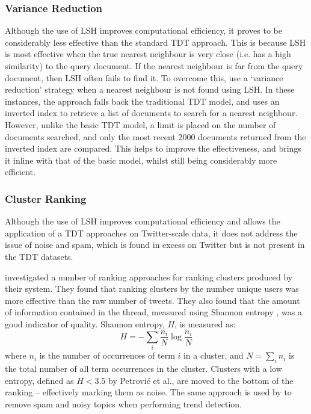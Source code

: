 \subsubsection{Variance Reduction}
Although the use of LSH improves computational efficiency, it proves to be considerably less effective than the standard TDT approach.
This is because LSH is most effective when the true nearest neighbour is very close (i.e. has a high similarity) to the query document.
If the nearest neighbour is far from the query document, then LSH often fails to find it.
To overcome this, \cite{Petrovic:2010:SFS:1857999.1858020} use a `variance reduction' strategy when a nearest neighbour is not found using LSH.
In these instances, the approach falls back the traditional TDT model, and uses an inverted index to retrieve a list of documents to search for a nearest neighbour.
However, unlike the basic TDT model, a limit is placed on the number of documents searched, and only the most recent 2000 documents returned from the inverted index are compared.
This helps to improve the effectiveness, and brings it inline with that of the basic model, whilst still being considerably more efficient.

\subsubsection{Cluster Ranking}
Although the use of LSH improves computational efficiency and allows the application of a TDT approaches on Twitter-scale data, it does not address the issue of noise and spam, which is found in excess on Twitter but is not present in the TDT datasets.

\cite{Petrovic:2010:SFS:1857999.1858020} investigated a number of ranking approaches for ranking clusters produced by their system.
They found that ranking clusters by the number unique users was more effective than the raw number of tweets.
They also found that the amount of information contained in the thread, measured using Shannon entropy \citep{Shannon:2001:MTC:584091.584093}, was a good indicator of quality.
Shannon entropy, $H$, is measured as:
\begin{equation}
	H = -\sum_i{\frac{n_i}{N} \log \frac{n_i}{N}}
\end{equation}
where $n_i$ is the number of occurrences of term $i$ in a cluster,	and $N = \sum_i{n_i}$ is the total number of all term occurrences in the cluster.
Clusters with a low entropy, defined as $H < 3.5$ by Petrović et al., are moved to the bottom of the ranking -- effectively marking them as noise.
The same approach is used by \cite{benhardus2013streaming} to remove spam and noisy topics when performing trend detection.

